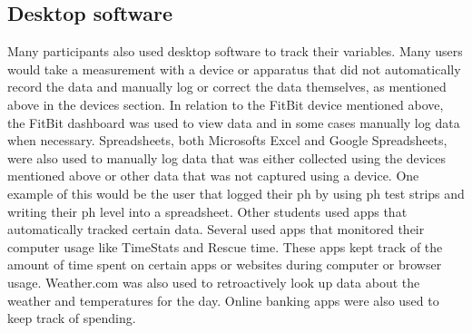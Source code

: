 \subsection{Desktop software} 
    Many participants also used desktop software to track their variables. Many users would take a measurement with a device or apparatus that did not automatically record the data and manually log or correct the data themselves, as mentioned above in the devices section. In relation to the FitBit device mentioned above, the FitBit dashboard was used to view data and in some cases manually log data when necessary. Spreadsheets, both Microsoft\textquotesingle s Excel and Google Spreadsheets, were also used to manually log data that was either collected using the devices mentioned above or other data that was not captured using a device. One example of this would be the user that logged their ph by using ph test strips and writing their ph level into a spreadsheet. 
    Other students used apps that automatically tracked certain data. Several used apps that monitored their computer usage like TimeStats and Rescue time. These apps kept track of the amount of time spent on certain apps or websites during computer or browser usage. Weather.com was also used to retroactively look up data about the weather and temperatures for the day. Online banking apps were also used to keep track of spending.